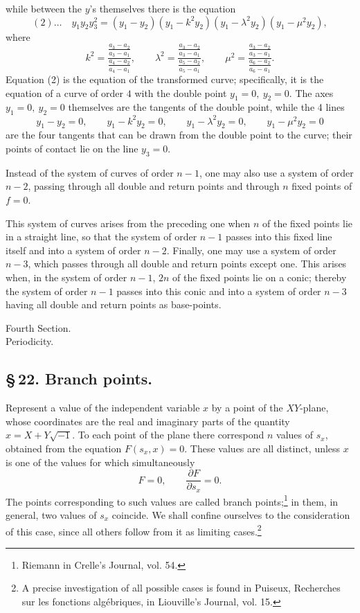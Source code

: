 \documentclass[10pt]{article}
\begin{document}
while between the \(y\)'s themselves there is the equation
\[
(2)\ldots\quad
y_1y_2y_3^2=(y_1-y_2)(y_1-k^2y_2)(y_1-\lambda^2y_2)(y_1-\mu^2y_2),
\]
where
\[
k^2=\frac{\frac{a_3-a_2}{a_3-a_1}}{\frac{a_4-a_2}{a_4-a_1}},
\qquad
\lambda^2=\frac{\frac{a_3-a_2}{a_3-a_1}}{\frac{a_5-a_2}{a_5-a_1}},
\qquad
\mu^2=\frac{\frac{a_3-a_2}{a_3-a_1}}{\frac{a_6-a_2}{a_6-a_1}}.
\]
Equation (2) is the equation of the transformed curve; specifically, it is the equation of a curve of order \(4\) with the double point \(y_1=0,\ y_2=0\). The axes \(y_1=0,\ y_2=0\) themselves are the tangents of the double point, while the 4 lines
\[
y_1-y_2=0,\qquad y_1-k^2y_2=0,\qquad
y_1-\lambda^2y_2=0,\qquad y_1-\mu^2y_2=0
\]
are the four tangents that can be drawn from the double point to the curve; their points of contact lie on the line \(y_3=0\).

Instead of the system of curves of order \(n-1\), one may also use a system of order \(n-2\), passing through all double and return points and through \(n\) fixed points of \(f=0\).

This system of curves arises from the preceding one when \(n\) of the fixed points lie in a straight line, so that the system of order \(n-1\) passes into this fixed line itself and into a system of order \(n-2\). Finally, one may use a system of order \(n-3\), which passes through all double and return points except one. This arises when, in the system of order \(n-1\), \(2n\) of the fixed points lie on a conic; thereby the system of order \(n-1\) passes into this conic and into a system of order \(n-3\) having all double and return points as base-points.

\begin{center}
{\large Fourth Section.}\\[0.35em]
{\Large Periodicity.}
\end{center}

\subsection*{\S\,22. Branch points.}

Represent a value of the independent variable \(x\) by a point of the \(XY\)-plane, whose coordinates are the real and imaginary parts of the quantity \(x=X+Y\sqrt{-1}\). To each point of the plane there correspond \(n\) values of \(s_x\), obtained from the equation \(F(s_x,x)=0\). These values are all distinct, unless \(x\) is one of the values for which simultaneously
\[
F=0,\qquad \frac{\partial F}{\partial s_x}=0.
\]
The points corresponding to such values are called branch points;\footnote{Riemann in Crelle's Journal, vol. 54.} in them, in general, two values of \(s_x\) coincide. We shall confine ourselves to the consideration of this case, since all others follow from it as limiting cases.\footnote{A precise investigation of all possible cases is found in Puiseux, Recherches sur les fonctions algébriques, in Liouville's Journal, vol. 15.}
\end{document}
